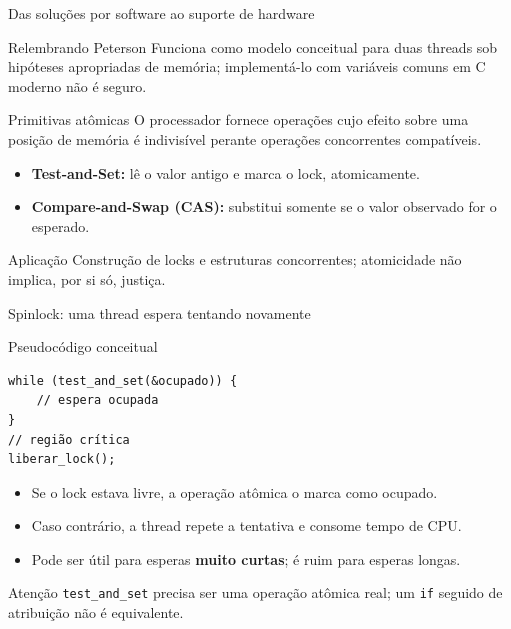 \documentclass[aspectratio=169,11pt]{beamer}
\begin{document}
\begin{frame}{Das soluções por software ao suporte de hardware}
\small
\begin{block}{Relembrando Peterson}
Funciona como modelo conceitual para duas threads sob hipóteses apropriadas de memória; implementá-lo com variáveis comuns em C moderno não é seguro.
\end{block}
\begin{block}{Primitivas atômicas}
O processador fornece operações cujo efeito sobre uma posição de memória é indivisível perante operações concorrentes compatíveis.
\end{block}
\begin{itemize}
\item \textbf{Test-and-Set:} lê o valor antigo e marca o lock, atomicamente.
\item \textbf{Compare-and-Swap (CAS):} substitui somente se o valor observado for o esperado.
\end{itemize}
\begin{alertblock}{Aplicação}
Construção de locks e estruturas concorrentes; atomicidade não implica, por si só, justiça.
\end{alertblock}
\end{frame}

\begin{frame}[fragile]{Spinlock: uma thread espera tentando novamente}
\small
\begin{block}{Pseudocódigo conceitual}
\begin{verbatim}
while (test_and_set(&ocupado)) {
    // espera ocupada
}
// região crítica
liberar_lock();
\end{verbatim}
\end{block}
\begin{itemize}
\item Se o lock estava livre, a operação atômica o marca como ocupado.
\item Caso contrário, a thread repete a tentativa e consome tempo de CPU.
\item Pode ser útil para esperas \textbf{muito curtas}; é ruim para esperas longas.
\end{itemize}
\begin{alertblock}{Atenção}
\texttt{test\_and\_set} precisa ser uma operação atômica real; um \texttt{if} seguido de atribuição não é equivalente.
\end{alertblock}
\end{frame}
\end{document}
